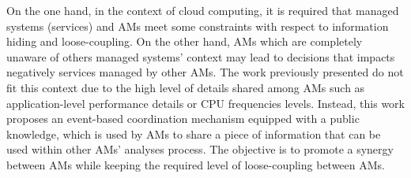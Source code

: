 On the one hand, in the context of cloud computing, it is required that managed systems (services) and AMs meet some constraints with respect to information hiding and loose-coupling. On the other hand, AMs which are completely unaware of others managed systems’ context may lead to decisions that impacts negatively services managed by other AMs. The work previously presented do not fit this context due to the high level of details shared among AMs such as application-level performance details or CPU frequencies levels. Instead, this work proposes an event-based coordination mechanism equipped with a public knowledge, which is used by AMs to share a piece of information that can be used within other AMs’ analyses process. The objective is to promote a synergy between AMs while keeping the required level of loose-coupling between AMs.



